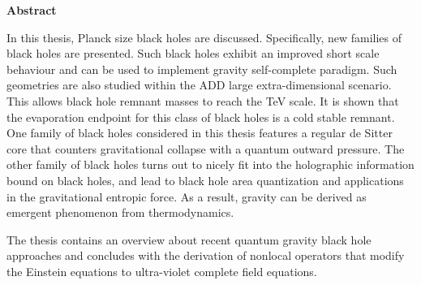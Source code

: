 \documentclass[12pt,a4paper]{report}
\numberwithin{equation}{chapter}
\begin{document}
\newpage
\begin{center}
 {\bfseries Abstract\vspace{-.5em}\vspace{0pt}}
\end{center}

In this thesis, Planck size black holes are discussed.
Specifically, new families of black holes are presented. Such black holes
exhibit an improved short scale behaviour and can be used to implement
gravity self-complete paradigm.
Such geometries are also studied within the ADD large extra-dimensional
scenario. This allows black hole remnant masses to reach the TeV scale.
It is shown that the evaporation endpoint for this class of black holes
is a cold stable remnant. One family of black holes considered in this
thesis features a regular de Sitter core that counters gravitational
collapse with a quantum outward pressure.
The other family of black holes turns out to nicely fit into the holographic
information bound on black holes, and lead to black hole area quantization
and applications in the gravitational entropic force. As a result,
gravity can be derived as emergent phenomenon from thermodynamics.

The thesis contains an overview about recent quantum gravity black hole
approaches and concludes with the derivation of nonlocal operators
that modify the Einstein equations to ultra-violet complete field equations.

\vfill

%
%
%
%
%
%
\vfill
\end{document}
